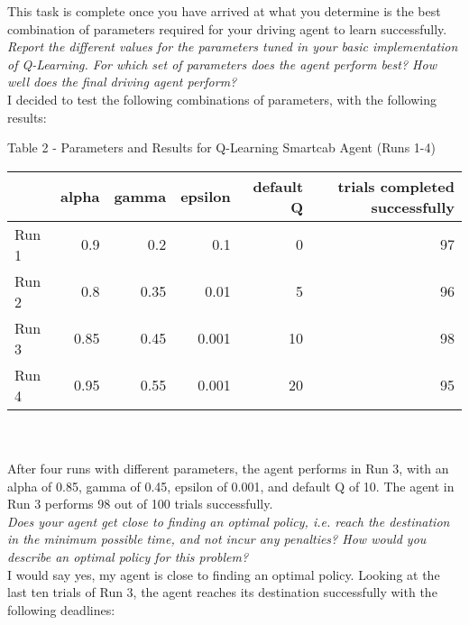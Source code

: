 \documentclass[11pt]{article}
\begin{document}
This task is complete once you have arrived at what you determine is the best combination of parameters required for your driving agent to learn successfully.\\

\textit{Report the different values for the parameters tuned in your basic implementation of Q-Learning. For which set of parameters does the agent perform best? How well does the final driving agent perform?}\\

I decided to test the following combinations of parameters, with the following results:\\

\begin{center} Table 2 - Parameters and Results for Q-Learning Smartcab Agent (Runs 1-4)
\end{center}
\begin{tabular}{ l r r r r r } \\
  \hline
  & alpha & gamma & epsilon & default Q & trials completed successfully\\
  \hline
  Run 1 & 0.9 & 0.2 & 0.1 & 0 & 97 \\
  Run 2 & 0.8 & 0.35 & 0.01 & 5 & 96 \\
  Run 3 & 0.85 & 0.45 & 0.001 & 10 & 98 \\
  Run 4 & 0.95 & 0.55 & 0.001 & 20 & 95 \\
\end{tabular}\\
\\

After four runs with different parameters, the agent performs in Run 3, with an alpha of 0.85, gamma of 0.45, epsilon of 0.001, and default Q of 10. The agent in Run 3 performs 98 out of 100 trials successfully.\\

\textit{Does your agent get close to finding an optimal policy, i.e. reach the destination in the minimum possible time, and not incur any penalties? How would you describe an optimal policy for this problem?}\\

I would say yes, my agent is close to finding an optimal policy. Looking at the last ten trials of Run 3, the agent reaches its destination successfully with the following deadlines:\\
\end{document}
